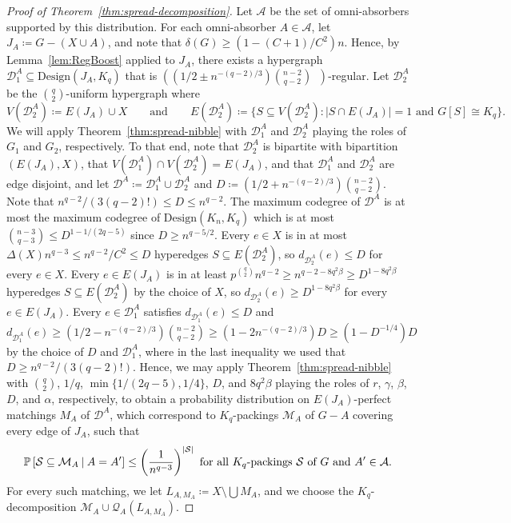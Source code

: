 \documentclass[11pt]{article}
\numberwithin{equation}{section}
\newcounter{i}
\theoremstyle{plain}
\theoremstyle{plain} %
\theoremstyle{definition}
\newcommand{\cA}{\mathcal{A}}
\newcommand{\cQ}{\mathcal{Q}}
\newcommand{\cD}{\mathcal{D}}
\newcommand{\cM}{\mathcal{M}}
\newcommand{\cS}{\mathcal{S}}
\newcommand{\ProbCond}[2]{\ensuremath{%
    \mathbb P\left[#1\:\middle|\:#2\right]
  }}
\begin{document}
\begin{proof}[Proof of Theorem~\ref{thm:spread-decomposition}]
  Let $\cA$ be the set of omni-absorbers supported by this distribution.  For each omni-absorber $A \in \cA$, let $J_A \coloneqq G - (X \cup A)$, and note that $\delta(G) \geq (1 - (C+1)/C^2)n$.  Hence, by Lemma~\ref{lem:RegBoost} applied to $J_A$, there exists a hypergraph $\cD^A_1 \subseteq \mathrm{Design}(J_A, K_q)$ that is $((1/2 \pm n^{-(q-2)/3})\left.\binom{n - 2}{q - 2}\middle.\right.)$-regular.
  Let $\cD^A_2$ be the $\binom{q}{2}$-uniform hypergraph where
  \begin{equation*}
      V(\cD^A_2) \coloneqq E(J_A) \cup X
      \qquad\text{and}\qquad
      E(\cD^A_2)\coloneqq\{S \subseteq V(\cD^A_2) : |S \cap E(J_A)| = 1 \text{ and } G[S] \cong K_q\}.
  \end{equation*}
  We will apply Theorem~\ref{thm:spread-nibble} with $\cD^A_1$ and $\cD^A_2$ playing the roles of $G_1$ and $G_2$, respectively.  To that end, note that $\cD^A_2$ is bipartite with bipartition $(E(J_A), X)$, that $V(\cD^A_1) \cap V(\cD^A_2) = E(J_A)$, and that $\cD^A_1$ and $\cD^A_2$ are edge disjoint, and let $\cD^A \coloneqq \cD^A_1 \cup \cD^A_2$ and $D \coloneqq (1/2 + n^{-(q-2)/3})\binom{n-2}{q-2}$.  Note that $n^{q-2}/(3(q-2)!) \leq D \leq n^{q - 2}$.
  The maximum codegree of $\cD^A$ is at most the maximum codegree of $\mathrm{Design}(K_n, K_q)$ which is at most $\binom{n - 3}{q - 3} \leq D^{1 - 1/(2q-5)}$ since $D \geq n^{q - 5/2}$.
  Every $e \in X$ is in at most $\Delta(X)n^{q-3} \leq n^{q-2}/C^2 \leq D$ hyperedges $S\subseteq E(\cD^A_2)$, so $d_{\cD^A_2}(e) \leq D$ for every $e \in X$.  
  Every $e \in E(J_A)$ is in at least $p^{\binom{q}{2}}n^{q - 2} \geq n^{q - 2 - 8q^2\beta} \geq D^{1 - 8q^2\beta}$ hyperedges $S \subseteq E(\cD^A_2)$ by the choice of $X$, so $d_{\cD^A_2}(e) \geq D^{1 - 8q^2\beta}$ for every $e \in E(J_A)$.
  Every $e \in \cD^A_1$ satisfies $d_{\cD^A_1}(e) \leq D$ and $d_{\cD^A_1}(e) \geq (1/2 - n^{-(q-2)/3})\binom{n-2}{q-2} \geq (1 - 2n^{-(q-2)/3})D \geq (1 - D^{-1/4})D$ by the choice of $D$ and $\cD^A_1$, where in the last inequality we used that $D \geq n^{q-2} / (3(q-2)!)$.
  Hence, we may apply Theorem~\ref{thm:spread-nibble} with $\binom{q}{2}$, $1/q$, $\min\{1/(2q-5), 1/4\}$, $D$, and $8q^2\beta$ playing the roles of $r$, $\gamma$, $\beta$, $D$, and $\alpha$, respectively, to obtain a probability distribution on $E(J_A)$-perfect matchings $M_A$ of $\cD^A$, which correspond to $K_q$-packings $\cM_A$ of $G - A$ covering every edge of $J_A$, such that
  \begin{equation}\label{eqn:nibble-spread}
      \ProbCond{\cS \subseteq \cM_A}{A = A'} \le \left(\frac{1}{n^{q-3}}\right)^{|\cS|} \text{ for all $K_q$-packings $\cS$ of $G$ and $A' \in \cA$}.
  \end{equation}
  For every such matching, we let $L_{A, M_A} \coloneqq X \setminus \bigcup M_A$, and we choose the $K_q$-decomposition $\cM_A \cup \cQ_A(L_{A, M_A})$.  
  

\end{proof}
\end{document}
